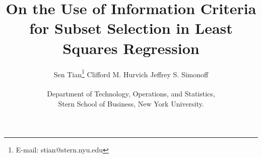 \documentclass{article}
\begin{document}
%

\def\spacingset#1{\renewcommand{\baselinestretch}%
{#1}\small\normalsize} \spacingset{1}


\title{\bf On the Use of Information Criteria for Subset Selection in Least Squares Regression}
\author{Sen Tian\footnote{E-mail: stian@stern.nyu.edu} \quad Clifford M. Hurvich  \quad Jeffrey S. Simonoff \\\\
  Department of Technology, Operations, and Statistics, \\Stern School of Business, New York University.}
\date{}
\maketitle









\clearpage




\end{document}
